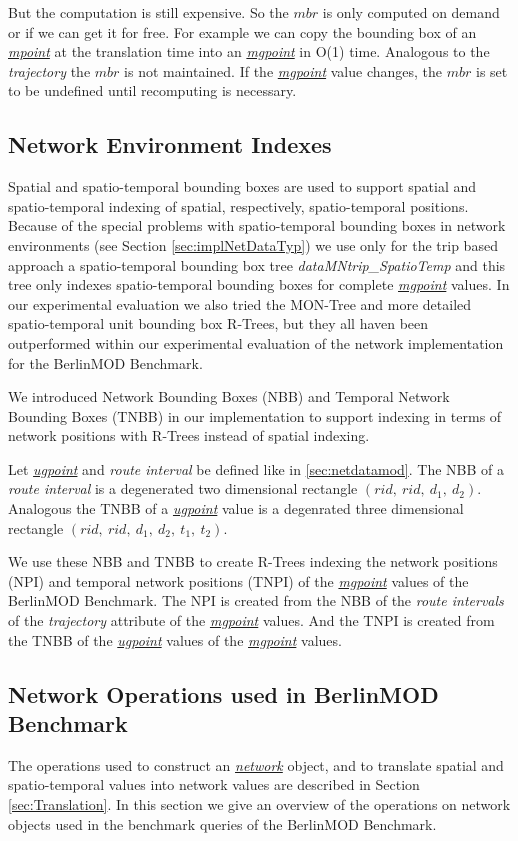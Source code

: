 \documentclass[a4paper]{article}
\newcommand{\bmodb} {BerlinMOD Benchmark}
\newcommand{\dt}[1]{\textsl{\underline{#1}}}
\begin{document}
But the computation is still expensive. So the $mbr$ is only computed on demand
or if we can get it for free. For example we can copy
the bounding box of an \dt{mpoint} at the translation time into an \dt{mgpoint}
in O(1) time.
Analogous to the \textit{trajectory} the $mbr$ is not maintained. If
the \dt{mgpoint} value changes, the $mbr$ is set to be undefined until
recomputing
is necessary.

\subsection{Network Environment Indexes}
\label{sec:implNetIndex}
Spatial and spatio-temporal bounding boxes are used to support spatial
and spatio-temporal indexing of spatial, respectively, spatio-temporal
positions.
Because of the special problems with spatio-temporal bounding boxes in network
environments (see Section \ref{sec:implNetDataTyp}) we use only for the trip
based approach a spatio-temporal bounding box tree
\textit{dataMNtrip\_SpatioTemp} and
this tree only indexes spatio-temporal bounding boxes for complete \dt{mgpoint}
values. In our experimental evaluation we also tried the MON-Tree 
\cite{MONTreeAlmeidaGeoinformatica} and more
detailed spatio-temporal unit bounding box R-Trees, but they all haven been
outperformed within our experimental evaluation of the network implementation
for the \bmodb{}.

We introduced Network Bounding Boxes (NBB) and Temporal Network Bounding Boxes
(TNBB) in our implementation to support indexing in terms of network positions
with R-Trees instead of spatial indexing.

Let \dt{ugpoint} and \textit{route interval} be defined like in
\ref{sec:netdatamod}.
The NBB of a \textit{route interval} is a degenerated two dimensional
rectangle $(rid,\ rid,\ d_1,\ d_2)$. Analogous the TNBB of a \dt{ugpoint}
value is a degenrated three dimensional rectangle $(rid,\ rid,\ d_1,\ d_2,\
t_1,\ t_2)$.

We use these NBB and TNBB to create R-Trees indexing the network
positions (NPI) and temporal network positions (TNPI) of the \dt{mgpoint} values
of the \bmodb{}. The NPI is created from the NBB of the \textit{route
intervals} of the \textit{trajectory} attribute of the \dt{mgpoint} values. And the
TNPI is created from the TNBB of the \dt{ugpoint} values of the \dt{mgpoint}
values.
\subsection{Network Operations used in \bmodb{}}
\label{sec:implNetOperations}
The operations used to construct an \dt{network} object, and
to translate spatial and spatio-temporal values into network values are
described in Section \ref{sec:Translation}. In this section we give an overview
of the operations on network objects used in the benchmark queries of the
\bmodb{}.
\end{document}
